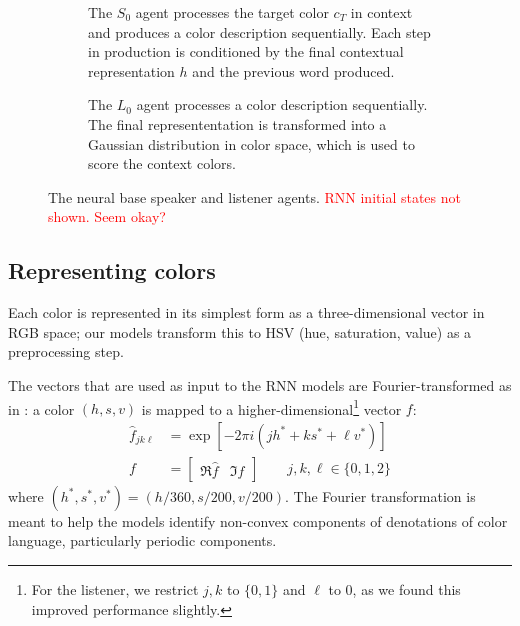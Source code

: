 \documentclass[11pt,letterpaper]{article}
\newcommand{\Listener}{L}
\newcommand{\Speaker}{S}
\newcommand{\feat}{f}
\renewcommand{\|}{\mid}
\newcommand{\todocheck}[1]{\textcolor{red}{#1}}
\begin{document}
\begin{figure}[t]
  \centering
  \begin{subfigure}[b]{0.48\textwidth}
    \centering
    
    \caption{The $\Speaker_{0}$ agent processes the target color
      $c_{T}$ in context and produces a color description
      sequentially. Each step in production is conditioned by the
      final contextual representation $h$ and the previous word
      produced.}
  \end{subfigure}
  \hfill
  \begin{subfigure}[b]{0.48\textwidth}
    \centering
    
    \caption{The $\Listener_{0}$ agent processes a color description
      sequentially. The final represententation is transformed into a
      Gaussian distribution in color space, which is used to score the
      context colors.}
  \end{subfigure}
  \caption{The neural base speaker and listener agents.
    \todocheck{RNN initial states not shown. Seem okay?}}
  \label{fig:model}
\end{figure}

\subsection{Representing colors}

Each color is represented in its simplest form as a three-dimensional vector in
RGB space; our models transform this to HSV (hue, saturation,
value) as a preprocessing step.

The vectors that are used as input to the RNN models are Fourier-transformed as in :
a color
$(h, s, v)$ is mapped to a higher-dimensional\footnote{For the listener, we restrict $j,k$ to $\{0, 1\}$ and $\ell$ to 0, as we
found this improved performance slightly.} vector $\feat$:
\begin{align*}
\hat{\feat}_{jk\ell} &= \exp \left[-2\pi i \left(jh^* + ks^* + \ell v^*\right)\right] \\
\feat &= \begin{bmatrix}
  \Re{\hat{\feat}} & \Im{\hat{\feat}}
\end{bmatrix}\qquad j,k,\ell \in \{0,1,2\} 
\end{align*}
where $(h^*, s^*, v^*) = (h / 360, s / 200, v/200)$.
The Fourier transformation is meant to help the models identify non-convex components
of denotations of color language, particularly periodic components.
\end{document}
